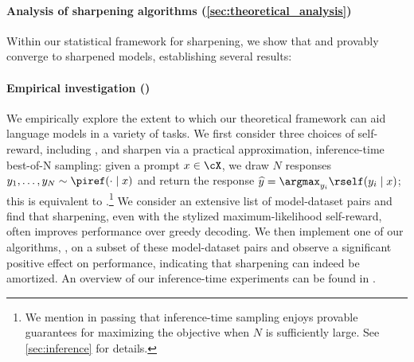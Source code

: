 \paragraph{Analysis of sharpening algorithms (\cref{sec:theoretical_analysis})}
Within our statistical framework for sharpening, we show that
\bestofnalg and \rlhfalg provably converge to sharpened models,
establishing several results:
\paragraph{Empirical investigation ()}  We
empirically explore the extent to which our theoretical framework can aid language models in a variety of tasks.  We first consider three choices of self-reward, including \mlsharp, and sharpen via a practical approximation, inference-time best-of-N sampling: given a prompt $x \in \cX$, we draw $N$ responses $y_1,\ldots,y_N\sim\piref(\cdot\mid{}x)$ and return the response $\widehat{y} = \argmax_{y_i} \rself(y_i \mid{}x)$; this is
equivalent to \iftoggle{workshop}{\cite{stiennon2020learning,gao2023scaling,yang2024asymptotics}}{\citet{stiennon2020learning,gao2023scaling,yang2024asymptotics}} .\footnote{We mention in passing that
  inference-time \bestofn sampling enjoys provable guarantees for
  maximizing the \mlsharp objective when $N$ is sufficiently
  large. See \cref{sec:inference} for details.}
We consider an extensive list of model-dataset pairs and find that sharpening, even with the stylized maximum-likelihood self-reward, often improves performance over greedy decoding. 
  We then implement one of our algorithms, \bestofnalg, on a subset of
  these model-dataset pairs and observe a significant positive effect
  on performance, indicating that sharpening can indeed be amortized.  An overview of our inference-time experiments can be found in .


